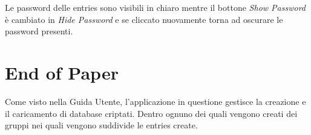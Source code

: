 \documentclass[a4paper,12pt]{report}
\begin{document}
Le password delle entries sono visibili in chiaro mentre il bottone \textit{Show Password} è cambiato in \textit{Hide Password} e se cliccato nuovamente torna ad oscurare le password presenti.


\section*{End of Paper}
Come visto nella Guida Utente, l'applicazione in questione gestisce la creazione e il caricamento di database criptati. Dentro ognuno dei quali vengono creati dei gruppi nei quali vengono suddivide le entries create.



\end{document}
